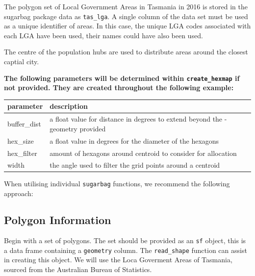 The polygon set of Local Government Areas in Tasmania in 2016 is stored
in the sugarbag package data as \texttt{tas\_lga}. A single column of
the data set must be used as a unique identifier of areas. In this case,
the unique LGA codes associated with each LGA have been used, their
names could have also been used.

The centre of the population hubs are used to distribute areas around
the closest captial city.

\textbf{The following parameters will be determined within
\texttt{create\_hexmap} if not provided. They are created throughout the
following example:}

\begin{Schunk}

\begin{tabular}{l|l}
\hline
parameter & description\\
\hline
buffer\_dist & a float value for distance in degrees to extend beyond the - geometry provided\\
\hline
hex\_size & a float value in degrees for the diameter of the hexagons\\
\hline
hex\_filter & amount of hexagons around centroid to consider for allocation\\
\hline
width & the angle used to filter the grid points around a centroid\\
\hline
\end{tabular}

\end{Schunk}

When utilising individual \texttt{sugarbag} functions, we recommend the
following approach:

\hypertarget{polygon-information}{%
\subsection{Polygon Information}\label{polygon-information}}

Begin with a set of polygons. The set should be provided as an
\texttt{sf} object, this is a data frame containing a \texttt{geometry}
column. The \texttt{read\_shape} function can assist in creating this
object. We will use the Loca Goverment Areas of Tasmania, sourced from
the Australian Bureau of Statistics.

